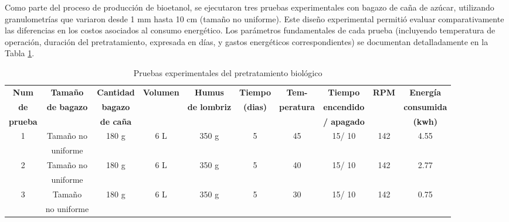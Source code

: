 \documentclass[12pt]{article}
\begin{document}
			
			
			Como parte del proceso de producción de bioetanol, se ejecutaron tres pruebas experimentales con bagazo de caña de azúcar, utilizando granulometrías que variaron desde 1 mm hasta 10 cm (tamaño no uniforme). Este diseño experimental permitió evaluar comparativamente las diferencias en los costos asociados al consumo energético. Los parámetros fundamentales de cada prueba (incluyendo temperatura de operación, duración del pretratamiento, expresada en días, y gastos energéticos correspondientes) se documentan detalladamente en la Tabla \ref{biolo parte 2}.
			
				\begin{table}[H]
				\centering
				 \caption{Pruebas experimentales del pretratamiento biológico}
				\label{biolo parte 2}
				\resizebox{16cm}{!} {
					\begin{tabular}{|c|c|c|c|c|c|c|c|c|c|   }
						\hline
						\textbf{Num} & \textbf{Tamaño } & \textbf{Cantidad } & \textbf{Volumen} & \textbf{Humus} & \textbf{Tiempo} & \textbf{Tem-} & \textbf{Tiempo} & \textbf{RPM}& \textbf{Energía} \\
						\textbf{de}& \textbf{ de bagazo} & \textbf{ bagazo} & & \textbf{de lombriz} & \textbf{(dias)} & \textbf{peratura}&  \textbf{ encendido}& & \textbf{consumida} \\
						
						\textbf{prueba}	& &  \textbf{ de caña} & &  &  &  &\textbf{ / apagado} & & \textbf{(kwh)}  \\
						
						
						\hline
						1 & Tamaño no & 180 g & 6 L & 350 g & 5 & 45 & 15/ 10 &  142 & 4.55\\
						& uniforme & &  & &  &   &  & & \\	\hline
						
						2 & Tamaño no & 180 g & 6 L & 350 g & 5 & 40 & 15/ 10 &  142 & 2.77\\
						& uniforme & &  & &  &   &  & & \\	\hline
						
						
						3 & Tamaño & 180 g & 6 L & 350 g & 5 & 30 & 15/ 10&  142 &0.75 \\
						& no uniforme & &  & &  &   &  & & \\	\hline
						
			
								\end{tabular}
	                         	}
	                   
              \end{table}
			
\end{document}
